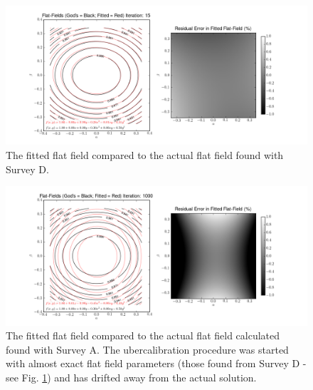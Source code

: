 \documentclass[12pt,a4paper,twoside]{article}
\begin{document}
\begin{figure}[ht]
\begin{center}
\includegraphics[width=\textwidth]{D_15_ff.png}
\end{center}
\caption{The fitted flat field compared to the actual flat field found with Survey D. \label{fig:D}}
\end{figure}

\begin{figure}[ht]
\begin{center}
\includegraphics[width=\textwidth]{A_1000_ff.png}
\end{center}
\caption{The fitted flat field compared to the actual flat field calculated found with Survey A. The ubercalibration procedure was started with almost exact flat field parameters (those found from Survey D - see Fig. \ref{fig:D}) and has drifted away from the actual solution. \label{fig:A}}
\end{figure}
\end{document}
